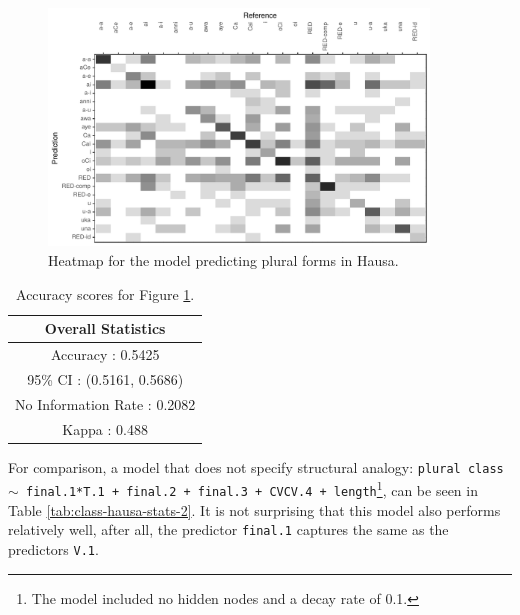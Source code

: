 \begin{figure}[!htpb]
  \includegraphics[width=0.9\textwidth]{./figures/hausa/plurals-cm.pdf}
  \caption{Heatmap for the model predicting plural forms in Hausa.}\label{fig:class-hausa-cm}
\end{figure}

\begin{table}[!htpb]
  \centering
  \begin{tabular}{rl}
    \toprule
    \multicolumn{2}{c}{Overall Statistics}                                         \\
    \midrule
    \multicolumn{2}{c}{Accuracy : 0.5425}                                          \\
    \multicolumn{2}{c}{95\% CI : (0.5161, 0.5686)}                                  \\
    \multicolumn{2}{c}{No Information Rate : 0.2082}                               \\
    \multicolumn{2}{c}{Kappa : 0.488}                                             \\
    \bottomrule
  \end{tabular}
  \caption{Accuracy scores for Figure \ref{fig:class-hausa-cm}.}\label{tab:class-hausa-stats}
\end{table}

For comparison, a model that does not specify structural analogy: \texttt{plural class $\sim$ final.1*T.1 + final.2 + final.3 + CVCV.4 + length}\footnote{The model included no hidden nodes and a decay rate of 0.1.}, can be seen in Table \ref{tab:class-hausa-stats-2}. It is not surprising that this model also performs relatively well, after all, the predictor \texttt{final.1} captures the same as the predictors \texttt{V.1}.

